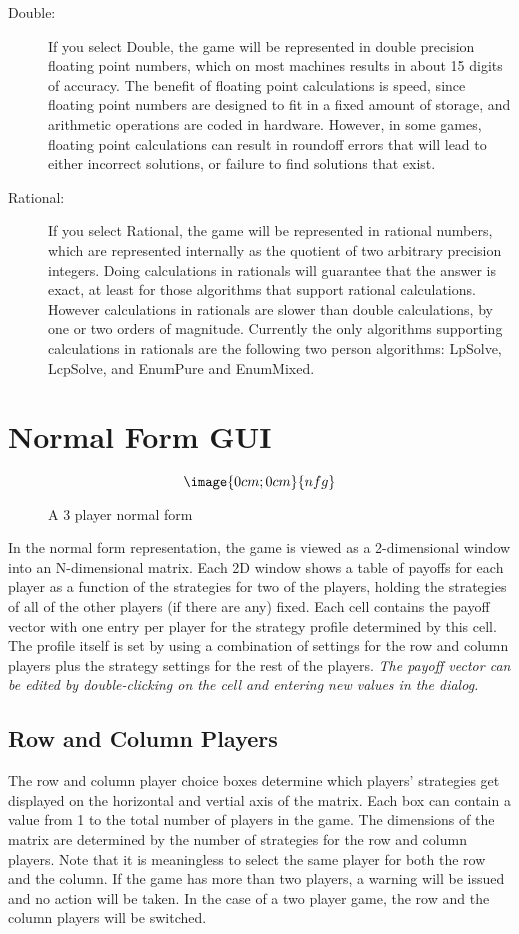 \begin{description}
\item[Double:]  If you select Double, the game will be represented in double precision floating
 point numbers, which on most machines results in about 15 digits of accuracy.  The benefit of 
floating point calculations is speed, since floating point numbers are designed to fit in a fixed 
amount of storage, and arithmetic operations are coded in hardware.  However,  in some games, 
floating point calculations can result in roundoff errors that will lead to either incorrect 
solutions, or failure to find solutions that exist.  
\item[Rational:]  If you select Rational, the game will be represented in rational numbers, 
which are represented internally as the quotient of two arbitrary precision integers.  Doing 
calculations in rationals will guarantee that the answer is exact, at least for those algorithms 
that support rational calculations.  However calculations in rationals are slower than double 
calculations, by one or two orders of magnitude.  Currently the only algorithms supporting 
calculations in rationals are the following two person algorithms: LpSolve, LcpSolve, and 
EnumPure and EnumMixed.  
\end{description}

\section{Normal Form GUI}

\begin{figure}
$$\image{0cm;0cm}{nfg}$$
\caption{A 3 player normal form}\label{fig:nfg}
\end{figure}

In the normal form representation, the game is viewed as a 2-dimensional
window into an N-dimensional matrix.  Each 2D window shows a table of
payoffs for each player as a function of the strategies for two of the
players, holding the strategies of all of the other players (if there are
any) fixed.  Each cell contains the payoff vector with one entry per
player for the strategy profile determined by this cell.  The profile
itself is set by using a combination of settings for the row and column
players plus the strategy settings for the rest of the players.  {\em The
payoff vector can be edited by double-clicking on the cell and entering
new values in the dialog.}

\subsection{Row and Column Players} The row and column player choice boxes
determine which players' strategies get displayed on the horizontal and
vertial axis of the matrix.  Each box can contain a value from 1 to the
total number of players in the game.  The dimensions of the matrix are
determined by the number of strategies for the row and column players.
Note that it is meaningless to select the same player for both the row and
the column.  If the game has more than two players, a warning will be
issued and no action will be taken.  In the case of a two player game, the
row and the column players will be switched.

